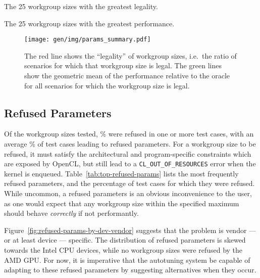 \begin{table}
  \parbox{.45\linewidth}{
    \centering
    \scriptsize
    
    \caption{The 25 workgroup sizes with the greatest legality.}
  }
  \hfill
  \parbox{.45\linewidth}{
    \centering
    \scriptsize
    
    \caption{The 25 workgroup sizes with the greatest performance.}
  }
\end{table}


\begin{figure}
\centering
\texttt{[image: gen/img/params\_summary.pdf]}
\caption{%
  The red line shows the ``legality'' of workgroup sizes, i.e.\ the
  ratio of scenarios for which that workgroup size is legal.  The
  green lines show the geometric mean of the performance relative to
  the oracle for all scenarios for which the workgroup size is legal.%
}
\label{fig:performance-legality}
\end{figure}

\subsection{Refused Parameters}

Of the  workgroup sizes tested,
\% were refused in one or more test
cases, with an average \% of test
cases leading to refused parameters. For a workgroup size to be
refused, it must satisfy the architectural and program-specific
constraints which are exposed by OpenCL, but still lead to a
\texttt{CL\_OUT\_OF\_RESOURCES} error when the kernel is
enqueued. Table~\ref{tab:top-refused-params} lists the most frequently
refused parameters, and the percentage of test cases for which they
were refused. While uncommon, a refused parameters is an obvious
inconvenience to the user, as one would expect that any workgroup size
within the specified maximum should behave \emph{correctly} if not
performantly.

Figure~\ref{fig:refused-params-by-dev-vendor} suggests that the
problem is vendor --- or at least device --- specific. The
distribution of refused parameters is skewed towards the Intel CPU
devices, while no workgroup sizes were refused by the AMD
GPU.  For now, it is imperative that the
autotuning system be capable of adapting to these refused parameters
by suggesting alternatives when they occur.

